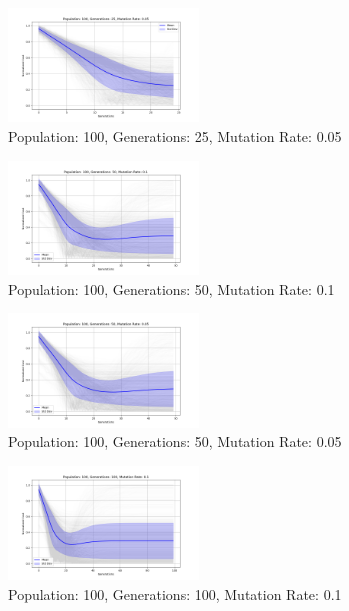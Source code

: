 \documentclass{article}
\begin{document}
    \begin{figure}[H]
        \centering
        \includegraphics[width=0.45\textwidth]{genetic_algorithm/appendix/Population_100_Generations_25_MutationRate_0.05}
        \caption{Population: 100, Generations: 25, Mutation Rate: 0.05}
        \label{fig:app_ga_100_25_05}
    \end{figure}

    \begin{figure}[H]
        \centering
        \includegraphics[width=0.45\textwidth]{genetic_algorithm/appendix/Population_100_Generations_50_MutationRate_0.1}
        \caption{Population: 100, Generations: 50, Mutation Rate: 0.1}
        \label{fig:app_ga_100_50_1}
    \end{figure}

    \begin{figure}[H]
        \centering
        \includegraphics[width=0.45\textwidth]{genetic_algorithm/appendix/Population_100_Generations_50_MutationRate_0.05}
        \caption{Population: 100, Generations: 50, Mutation Rate: 0.05}
        \label{fig:app_ga_100_50_05}
    \end{figure}

    \begin{figure}[H]
        \centering
        \includegraphics[width=0.45\textwidth]{genetic_algorithm/appendix/Population_100_Generations_100_MutationRate_0.1}
        \caption{Population: 100, Generations: 100, Mutation Rate: 0.1}
        \label{fig:app_ga_100_100_1}
    \end{figure}
\end{document}
